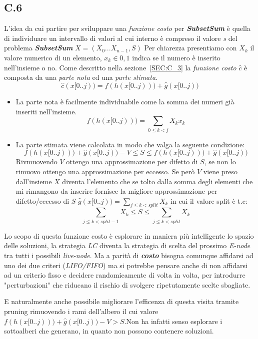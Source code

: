 \documentclass[a4paper]{article}
\newcommand{\imp}[1]{\textbf{\textit{#1}}}
\begin{document}
\subsection{C.6}
L'idea da cui partire per sviluppare una \textit{funzione costo} per \imp{SubsetSum} è quella di individuare un intervallo di valori al cui interno è compreso il valore \emph{s} del problema \imp{SubsetSum} $X =({X_0 ... X_{n-1}},S)$ 
Per chiarezza presentiamo con $X_k$ il valore numerico di un elemento, $x_k \in {0,1}$ indica se il numero è inserito nell'insieme o no.
Come descritto nella sezione~\ref{SEC:C_3} la \textit{funzione costo} $\hat c$ è composta da una \textit{parte nota} ed una \textit{parte stimata}.
$$\hat c(x[0..j)) = f(h(x[0..j))) + \hat g(x[0..j))$$
\begin{itemize}
	\item La parte nota è facilmente individuabile come la somma dei numeri già inseriti nell'insieme.$$ f(h(x[0..j)))=\sum_{0 \leq k < j} X_kx_k$$
	\item La parte stimata viene calcolata in modo che valga la seguente condizione:
		$$ f(h(x[0..j))) + \hat g(x[0..j)) - V \leq S \leq f(h(x[0..j))) + \hat g(x[0..j)) $$
	Rivmuovendo $V$ ottengo una approssimazione per difetto di $S$, se non lo rimuovo ottengo una approssimazione per eccesso.
	Se però $V$ viene preso dall'insieme $X$ diventa l'elemento che se tolto dalla somma degli elementi che mi rimangono da inserire fornisce la migliore approssimazione per difetto/eccesso di $S$
	$ \hat g(x[0..j))=\sum_{j \leq k < split} X_k$ in cui il valore split è t.c:
	$$\sum_{j \leq k < split-1} X_k \leq S \leq \sum_{j \leq k < split} X_k$$
\end{itemize}
Lo scopo di questa funzione costo è esplorare in maniera più intelligente lo spazio delle soluzioni, la strategia \textit{LC} diventa la strategia di scelta del prossimo \textit{E-node} tra tutti i possibili \textit{live-node}.
Ma a parità di \imp{costo} bisogna comunque affidarsi ad uno dei due criteri (\textit{LIFO/FIFO}) ma si potrebbe pensare anche di non affidarsi ad un criterio fisso e decidere randomicamente di volta in volta, per introdurre "perturbazioni" che riducano il rischio di svolgere ripetutamente scelte sbagliate.

E naturalmente anche possibile migliorare l'efficenza di questa visita tramite pruning rimuovendo i rami dell'albero il cui valore $ f(h(x[0..j))) + \hat g(x[0..j)) - V > S$.Non ha infatti senso esplorare i sottoalberi che generano, in quanto non possono contenere soluzioni.
\end{document}
